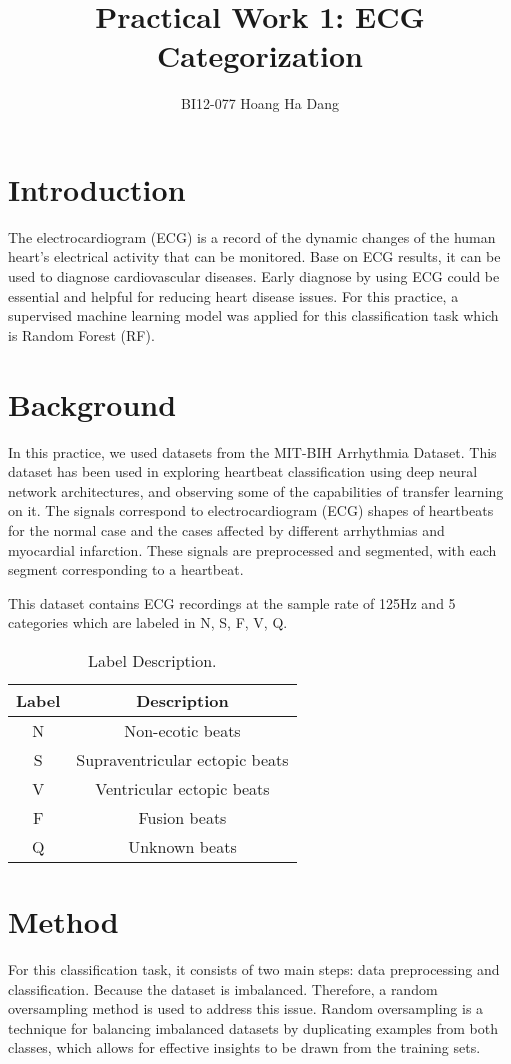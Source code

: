\documentclass{article}
\title{Practical Work 1: ECG Categorization}
\author{BI12-077 Hoang Ha Dang}
\begin{document}
\maketitle

\section{Introduction}
 The electrocardiogram (ECG) is a record of the dynamic changes of the human heart's electrical activity that can be monitored. Base on ECG results, it can be used to diagnose cardiovascular diseases. Early diagnose by using ECG could be essential and helpful for reducing heart disease issues. For this practice, a supervised machine learning model was applied for this classification task which is Random Forest (RF). 
\section{Background}
In this practice, we used datasets from the MIT-BIH Arrhythmia Dataset. This dataset has been used in exploring heartbeat classification using deep neural network architectures, and observing some of the capabilities of transfer learning on it. The signals correspond to electrocardiogram (ECG) shapes of heartbeats for the normal case and the cases affected by different arrhythmias and myocardial infarction. These signals are preprocessed and segmented, with each segment corresponding to a heartbeat. 


This dataset contains ECG recordings at the sample rate of 125Hz and 5 categories which are labeled in N, S, F, V, Q.
\begin{table}[h]
  \centering %
  \begin{tabular}{|c|c|}
    \hline
    Label& Description\\
    \hline
    N& Non-ecotic beats\\
    \hline
    S& Supraventricular ectopic beats\\
    \hline
 V&Ventricular ectopic beats\\\hline
 F&Fusion beats\\\hline
 Q&Unknown beats\\\hline
  \end{tabular}
  \caption{Label Description.} %
\end{table}
\section{Method}
For this classification task, it consists of two main steps: data preprocessing and classification. Because the dataset is imbalanced. Therefore, a random oversampling method is used to address this issue. Random oversampling is a technique for balancing imbalanced datasets by duplicating examples from both classes, which allows for effective insights to be drawn from the training sets.
\end{document}
